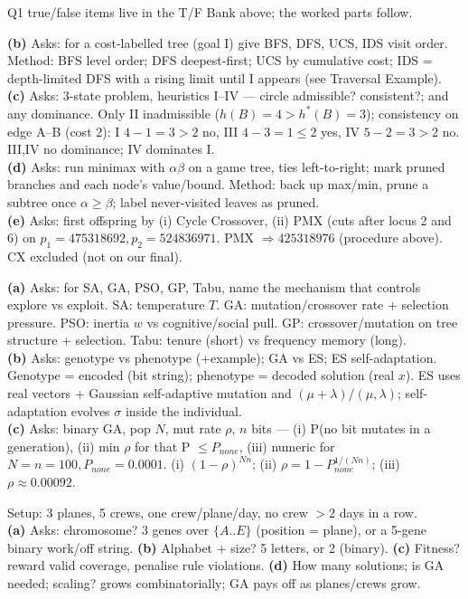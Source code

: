 Q1 true/false items live in the T/F Bank above; the worked parts follow.

\textbf{(b)} Asks: for a cost-labelled tree (goal I) give BFS, DFS, UCS, IDS visit order. Method: BFS level order; DFS deepest-first; UCS by cumulative cost; IDS = depth-limited DFS with a rising limit until I appears (see Traversal Example).\\
\textbf{(c)} Asks: 3-state problem, heuristics I--IV --- circle admissible? consistent?; and any dominance. Only II inadmissible (\(h(B){=}4{>}h^*(B){=}3\)); consistency on edge A--B (cost 2): I \(4{-}1{=}3{>}2\) no, III \(4{-}3{=}1\le2\) yes, IV \(5{-}2{=}3{>}2\) no. III,IV no dominance; IV dominates I.\\
\textbf{(d)} Asks: run minimax with \(\alpha\beta\) on a game tree, ties left-to-right; mark pruned branches and each node's value/bound. Method: back up max/min, prune a subtree once \(\alpha\ge\beta\); label never-visited leaves as pruned.\\
\textbf{(e)} Asks: first offspring by (i) Cycle Crossover, (ii) PMX (cuts after locus 2 and 6) on \(p_1{=}475318692,p_2{=}524836971\). PMX \(\Rightarrow425318976\) (procedure above). CX excluded (not on our final).

\textbf{(a)} Asks: for SA, GA, PSO, GP, Tabu, name the mechanism that controls explore vs exploit. SA: temperature \(T\). GA: mutation/crossover rate + selection pressure. PSO: inertia \(w\) vs cognitive/social pull. GP: crossover/mutation on tree structure + selection. Tabu: tenure (short) vs frequency memory (long).\\
\textbf{(b)} Asks: genotype vs phenotype (+example); GA vs ES; ES self-adaptation. Genotype = encoded (bit string); phenotype = decoded solution (real \(x\)). ES uses real vectors + Gaussian self-adaptive mutation and \((\mu{+}\lambda)/(\mu,\lambda)\); self-adaptation evolves \(\sigma\) inside the individual.\\
\textbf{(c)} Asks: binary GA, pop \(N\), mut rate \(\rho\), \(n\) bits --- (i) P(no bit mutates in a generation), (ii) min \(\rho\) for that P \(\le P_{none}\), (iii) numeric for \(N{=}n{=}100,P_{none}{=}0.0001\). (i) \((1-\rho)^{Nn}\); (ii) \(\rho=1-P_{none}^{1/(Nn)}\); (iii) \(\rho\approx0.00092\).

Setup: 3 planes, 5 crews, one crew/plane/day, no crew \(>2\) days in a row.\\
\textbf{(a)} Asks: chromosome? 3 genes over \(\{A..E\}\) (position = plane), or a 5-gene binary work/off string. \textbf{(b)} Alphabet + size? 5 letters, or 2 (binary). \textbf{(c)} Fitness? reward valid coverage, penalise rule violations. \textbf{(d)} How many solutions; is GA needed; scaling? grows combinatorially; GA pays off as planes/crews grow.

